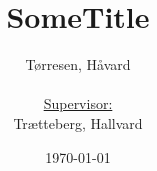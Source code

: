 \documentclass[titlepage, a4paper]{article}
\title{
 SomeTitle\\
}
\author{
    Tørresen, Håvard\\
    \\
    \underline{Supervisor:}\\
    Trætteberg, Hallvard
    \\
}
\date{\today}
\begin{document}
\maketitle
\begin{abstract}\label{abstract}
    
\end{abstract}
\newpage
\renewcommand{\abstractname}{Acknowledgements}
\begin{abstract}\label{acknowledgements}
    
\end{abstract}
\newpage

\tableofcontents
\listoffigures
\listoflistings








\appendix

\label{Glossary}
\printglossaries



\end{document}
